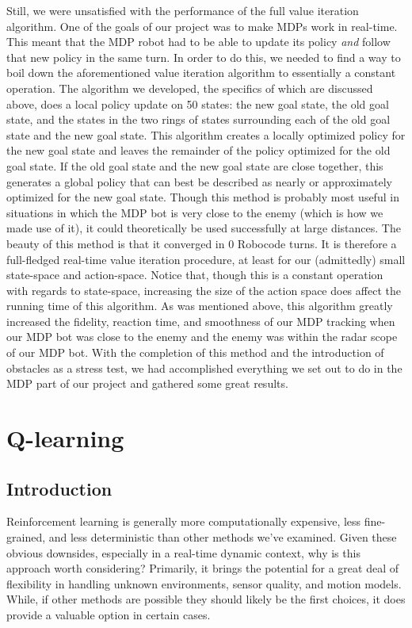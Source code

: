 \documentclass{aiaa-tc}%
\begin{document}
Still, we were unsatisfied with the performance of the full value iteration algorithm. One of the goals of our project was to make MDPs work in real-time. This meant that the MDP robot had to be able to update its policy \emph{and} follow that new policy in the same turn. In order to do this, we needed to find a way to boil down the aforementioned  value iteration algorithm to essentially a constant operation. The algorithm we developed, the specifics of which are discussed above, does a local policy update on 50 states: the new goal state, the old goal state, and the states in the two rings of states surrounding each of the old goal state and the new goal state. This algorithm creates a locally optimized policy for the new goal state and leaves the remainder of the policy optimized for the old goal state. If the old goal state and the new goal state are close together, this generates a global policy that can best be described as nearly or approximately optimized for the new goal state. Though this method is probably most useful in situations in which the MDP bot is very close to the enemy (which is how we made use of it), it could theoretically be used successfully at large distances. The beauty of this method is that it converged in 0 Robocode turns. It is therefore a full-fledged real-time value iteration procedure, at least for our (admittedly) small state-space and action-space. Notice that, though this is a constant operation with regards to state-space, increasing the size of the action space does affect the running time of this algorithm. As was mentioned above, this algorithm greatly increased the fidelity, reaction time, and smoothness of our MDP tracking when our MDP bot was close to the enemy and the enemy was within the radar scope of our MDP bot. With the completion of this method and the introduction of obstacles as a stress test, we had accomplished everything we set out to do in the MDP part of our project and gathered some great results.
\section{Q-learning}
\label{Q-learning}
\subsection{Introduction}
Reinforcement learning is generally more computationally expensive,
less fine-grained, and less deterministic than other methods we've
examined. Given these obvious downsides, especially in a
real-time dynamic context, why is this approach worth
considering? Primarily, it brings the potential for a great deal of
flexibility in handling unknown environments, sensor quality, and
motion models. While, if other methods are possible they should likely
be the first choices, it does provide a valuable option in certain
cases. 
\end{document}
